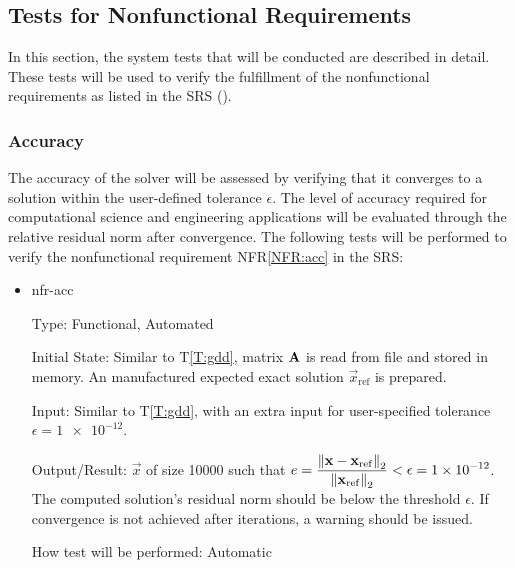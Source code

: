 \documentclass[12pt, titlepage]{article}
\newcounter{testnum} %
\newcommand{\tref}[1]{T\ref{#1}}
\newcommand{\nfrref}[1]{NFR\ref{#1}}
\begin{document}
\subsection{Tests for Nonfunctional Requirements}





In this section, the system tests that will be conducted are described in
detail. These tests will be used to verify the fulfillment of the nonfunctional
requirements as listed in the SRS (\cite{SRS}).

\subsubsection{Accuracy}

The accuracy of the solver will be assessed by verifying that it converges to a
solution within the user-defined tolerance \(\epsilon\). The level of accuracy
required for computational science and engineering applications will be
evaluated through the relative residual norm after convergence. The following
tests will be performed to verify the nonfunctional requirement \nfrref{NFR:acc}
in the SRS:

\begin{itemize}

\item[T\refstepcounter{testnum}\thetestnum \label{T:acc}:]{nfr-acc}

Type: Functional, Automated

Initial State: Similar to \tref{T:gdd}, matrix \(\mathbf{A}\) is read from file
and stored in memory. An manufactured expected exact solution
\(\vec{x}_\mathrm{ref}\) is prepared.

Input: Similar to \tref{T:gdd}, with an extra input for user-specified tolerance
\(\epsilon = \num{1e-12}\).

Output/Result: \(\vec{x}\) of size \num{10000} such that \(e = \displaystyle
\frac{\left\lVert\mathbf{x} - \mathbf{x}_\mathrm{ref}\right\rVert_2}{\left\lVert\mathbf{x}_\mathrm{ref}\right\rVert_2} <
\epsilon = \num{1e-12}\). The computed solution’s residual norm should be below
the threshold \(\epsilon\). If convergence is not achieved after iterations, a
warning should be issued.

How test will be performed: Automatic

\end{itemize}
\end{document}
